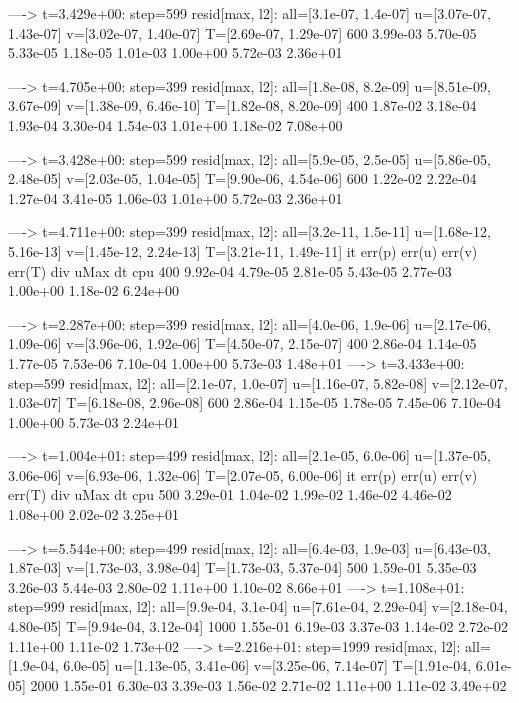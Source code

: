 {%
 ----> t=3.429e+00: step=599 resid[max, l2]: all=[3.1e-07, 1.4e-07] u=[3.07e-07, 1.43e-07] v=[3.02e-07, 1.40e-07] T=[2.69e-07, 1.29e-07]
       600 3.99e-03 5.70e-05 5.33e-05 1.18e-05 1.01e-03  1.00e+00 5.72e-03 2.36e+01



 ----> t=4.705e+00: step=399 resid[max, l2]: all=[1.8e-08, 8.2e-09] u=[8.51e-09, 3.67e-09] v=[1.38e-09, 6.46e-10] T=[1.82e-08, 8.20e-09]
       400 1.87e-02 3.18e-04 1.93e-04 3.30e-04 1.54e-03  1.01e+00 1.18e-02 7.08e+00 

 ----> t=3.428e+00: step=599 resid[max, l2]: all=[5.9e-05, 2.5e-05] u=[5.86e-05, 2.48e-05] v=[2.03e-05, 1.04e-05] T=[9.90e-06, 4.54e-06]
       600 1.22e-02 2.22e-04 1.27e-04 3.41e-05 1.06e-03  1.01e+00 5.72e-03 2.36e+01


 ----> t=4.711e+00: step=399 resid[max, l2]: all=[3.2e-11, 1.5e-11] u=[1.68e-12, 5.16e-13] v=[1.45e-12, 2.24e-13] T=[3.21e-11, 1.49e-11]
        it   err(p)   err(u)   err(v)   err(T)    div       uMax     dt       cpu
       400 9.92e-04 4.79e-05 2.81e-05 5.43e-05 2.77e-03  1.00e+00 1.18e-02 6.24e+00 

 ----> t=2.287e+00: step=399 resid[max, l2]: all=[4.0e-06, 1.9e-06] u=[2.17e-06, 1.09e-06] v=[3.96e-06, 1.92e-06] T=[4.50e-07, 2.15e-07]
       400 2.86e-04 1.14e-05 1.77e-05 7.53e-06 7.10e-04  1.00e+00 5.73e-03 1.48e+01
 ----> t=3.433e+00: step=599 resid[max, l2]: all=[2.1e-07, 1.0e-07] u=[1.16e-07, 5.82e-08] v=[2.12e-07, 1.03e-07] T=[6.18e-08, 2.96e-08]
       600 2.86e-04 1.15e-05 1.78e-05 7.45e-06 7.10e-04  1.00e+00 5.73e-03 2.24e+01




% 
 ----> t=1.004e+01: step=499 resid[max, l2]: all=[2.1e-05, 6.0e-06] u=[1.37e-05, 3.06e-06] v=[6.93e-06, 1.32e-06] T=[2.07e-05, 6.00e-06]
        it   err(p)   err(u)   err(v)   err(T)    div       uMax     dt       cpu
       500 3.29e-01 1.04e-02 1.99e-02 1.46e-02 4.46e-02  1.08e+00 2.02e-02 3.25e+01


----> t=5.544e+00: step=499 resid[max, l2]: all=[6.4e-03, 1.9e-03] u=[6.43e-03, 1.87e-03] v=[1.73e-03, 3.98e-04] T=[1.73e-03, 5.37e-04]
       500 1.59e-01 5.35e-03 3.26e-03 5.44e-03 2.80e-02  1.11e+00 1.10e-02 8.66e+01
 ----> t=1.108e+01: step=999 resid[max, l2]: all=[9.9e-04, 3.1e-04] u=[7.61e-04, 2.29e-04] v=[2.18e-04, 4.80e-05] T=[9.94e-04, 3.12e-04]
      1000 1.55e-01 6.19e-03 3.37e-03 1.14e-02 2.72e-02  1.11e+00 1.11e-02 1.73e+02 
 ----> t=2.216e+01: step=1999 resid[max, l2]: all=[1.9e-04, 6.0e-05] u=[1.13e-05, 3.41e-06] v=[3.25e-06, 7.14e-07] T=[1.91e-04, 6.01e-05]
      2000 1.55e-01 6.30e-03 3.39e-03 1.56e-02 2.71e-02  1.11e+00 1.11e-02 3.49e+02 

}
